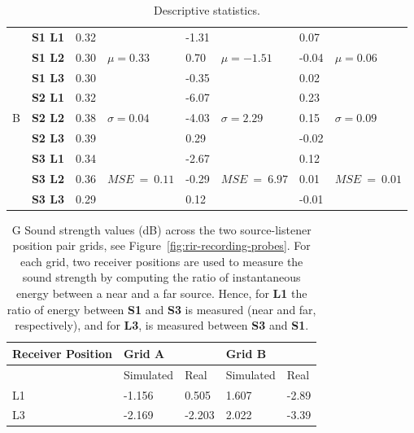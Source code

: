 \begin{table}[]
\begin{tabular}{@{}llllllll@{}}
    \multirow{9}{*}{B}& \textbf{S1 L1} & 0.32 & \multirow{3}{*}{$\mu = 0.33$} & -1.31 & \multirow{3}{*}{$\mu = -1.51$} & 0.07  & \multirow{3}{*}{$\mu = 0.06$} \\ 
       & \textbf{S1 L2} & 0.30 &                       & 0.70  &                        & -0.04 &                       \\
       & \textbf{S1 L3} & 0.30 &                       & -0.35 &                        & 0.02  &                       \\
       & \textbf{S2 L1} & 0.32 & \multirow{3}{*}{$\sigma = 0.04$} & -6.07 & \multirow{3}{*}{$\sigma = 2.29$}  & 0.23  & \multirow{3}{*}{$\sigma = 0.09$} \\
       & \textbf{S2 L2} & 0.38 &                       & -4.03 &                        & 0.15  &                       \\
       & \textbf{S2 L3} & 0.39 &                       & 0.29  &                        & -0.02 &                       \\
       & \textbf{S3 L1} & 0.34 & \multirow{3}{*}{$\scriptstyle{MSE}~=~0.11$} & -2.67 & \multirow{3}{*}{$\scriptstyle{MSE}~=~6.97$}  & 0.12  & \multirow{3}{*}{$\scriptstyle{MSE}~=~0.01$} \\
       & \textbf{S3 L2} & 0.36 &                       & -0.29 &                        & 0.01  &                       \\
       & \textbf{S3 L3} & 0.29 &                       & 0.12  &                        & -0.01 &                       \\ \cmidrule(r){1-8}
\end{tabular}

\caption{Descriptive statistics.}
\label{tab:rt-metrics-stats}
\end{table}

\begin{table}[]
\centering
\begin{tabular}{@{}lllll@{}}
\toprule
Receiver Position & \multicolumn{2}{l}{Grid A} & \multicolumn{2}{l}{Grid B} \\ \midrule
                  & Simulated     & Real       & Simulated      & Real      \\
L1                & -1.156        & 0.505      & 1.607          & -2.89     \\
L3                & -2.169        & -2.203     & 2.022          & -3.39     \\ \bottomrule
\end{tabular}%
\caption{G Sound strength values (dB) across the two source-listener position pair grids, see Figure~\ref{fig:rir-recording-probes}. For each grid, two receiver positions are used to measure the sound strength by computing the ratio of instantaneous energy between a near and a far source. Hence, for \textbf{L1} the ratio of energy between \textbf{S1} and \textbf{S3} is measured (near and far, respectively), and for \textbf{L3}, is measured between \textbf{S3} and  \textbf{S1}.}
\label{tab:g-scores}
\end{table}

